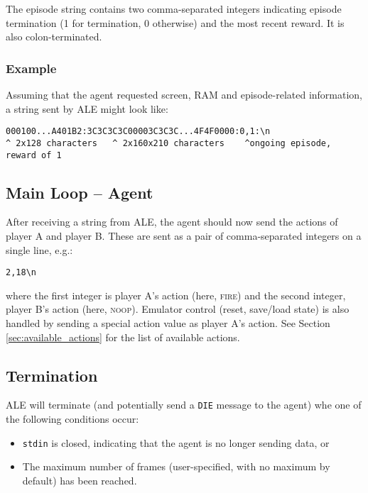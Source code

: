 \documentclass[12pt]{article}
\begin{document}
The episode string contains two comma-separated integers indicating episode termination (1 for
termination, 0 otherwise) and the most recent reward. It is also colon-terminated.

\subsubsection{Example}

Assuming that the agent requested screen, RAM and episode-related information, a string sent by ALE might look like:

\begin{verbatim}
000100...A401B2:3C3C3C3C00003C3C3C...4F4F0000:0,1:\n
^ 2x128 characters   ^ 2x160x210 characters    ^ongoing episode, reward of 1
\end{verbatim}

\subsection{Main Loop -- Agent}

After receiving a string from ALE, the agent should now send the actions of player A and player B.
These are sent as a pair of comma-separated integers on a single line, e.g.:

\begin{verbatim}
2,18\n
\end{verbatim}

where the first integer is player A's action (here, \textsc{fire}) and the second integer, player B's action (here, \textsc{noop}). Emulator control (reset, save/load state) is also handled by sending a special action value as player A's action. See Section \ref{sec:available_actions} for the list of available actions.

\subsection{Termination}\label{subsec:termination_conditions}

ALE will terminate (and potentially send a \verb+DIE+ message to the agent) whe one of the following conditions occur:

\begin{itemize}
  \item{\texttt{stdin} is closed, indicating that the agent is no longer sending data, or}
  \item{The maximum number of frames (user-specified, with no maximum by default) has been reached.}
\end{itemize}
\end{document}
